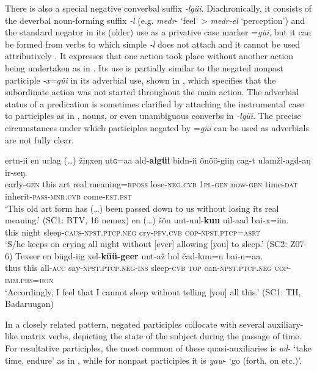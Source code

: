 \documentclass[output=paper,colorlinks,citecolor=brown,chinesefont]{langscibook}
\begin{document}
There is also a special negative converbal suffix \textit{-lgüi}. Diachronically, it consists of the deverbal noun-forming suffix \textit{-l} (e.g. \textit{medr}{}- ‘feel’ > \textit{medr-el} ‘perception’) and the standard negator in its (older) use as a privative case marker =\textit{güi}, but it can be formed from verbs to which simple \textit{-l} does not attach and it cannot be used attributively \citep{Bjambasan1985}. It expresses that one action took place without another action being undertaken as in . Its use is partially similar to the negated nonpast participle \textit{-x=güi} in its adverbial use, shown in , which specifies that the subordinate action was not started throughout the main action. The adverbial status of a predication is sometimes clarified by attaching the instrumental case to participles as in , nouns, or even unambiguous converbs in \textit{-lgüi}. The precise circumstances under which participles negated by =\textit{güi} can be used as adverbials are not fully clear.

\ea\label{ex:kha:43}
    \gll ertn-ii en urlag (…)   žiŋxeŋ  utɢ=aa ald-\textbf{algüi} bidn-ii önöö-giiŋ cag-t ulamžl-agd-aŋ ir-seŋ. \\ 
         early-\textsc{gen} this art {} real meaning=\textsc{rposs} lose-\textsc{neg.cvb} \textsc{1pl-gen} now-\textsc{gen} time-\textsc{dat} inherit-\textsc{pass-mnr.cvb} come-\textsc{est.pst} \\
    \glt ‘This old art form has (…) been passed down to us without losing its real meaning.’ (SC1: BTV, 16 nemex)
\z 
\ea\label{ex:kha:44}
    \gll en (…) šön   unt-uul-\textbf{kuu} uil-aad bai-x=iin. \\ 
         this {} night sleep-\textsc{caus-npst.ptcp.neg} cry-\textsc{pfv.cvb} \textsc{cop-npst.ptcp=asrt} \\
    \glt ‘S/he keeps on crying all night without [ever] allowing [you] to sleep.’ (SC2: Z07-6)
\z 
\ea\label{ex:kha:45}
    \gll Texeer en bügd-iig xel-\textbf{küü-geer} unt-až bol  čad-kuu=n bai-n=aa.\\ 
         thus this all-\textsc{acc} say-\textsc{npst.ptcp.neg-ins} sleep-\textsc{cvb} \textsc{top} can\textsc{-npst.ptcp.neg} \textsc{cop-imm.prs=hon}\\
    \glt ‘Accordingly, I feel that I cannot sleep without telling [you] all this.’ (SC1: TH, Badaruugan)
\z 

In a closely related pattern, negated participles collocate with several auxiliary-like matrix verbs, depicting the state of the subject during the passage of time. For resultative participles, the most common of these quasi-auxiliaries is \textit{ud}{}- ‘take time, endure’ as in , while for nonpast participles it is \textit{yaw}{}- ‘go (forth, on etc.)’.  
\end{document}
